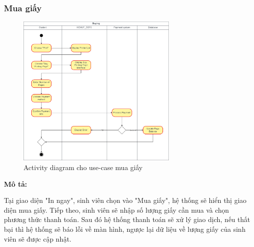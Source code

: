 \subsubsection{Mua giấy}
\begin{figure}[H]
    \begin{center}
        \includegraphics[width=0.7\textwidth]{Images/System Modelling/Buying_Activity.png}
        \caption{Activity diagram cho use-case mua giấy}
    \end{center}
\end{figure}
\textbf{Mô tả: }\par
Tại giao diện "In ngay", sinh viên chọn vào "Mua giấy", hệ thống sẽ hiển thị giao diện mua giấy. Tiếp theo, sinh viên sẽ nhập số lượng giấy cần mua và chọn phương thức thanh toán. Sau đó hệ thống thanh toán sẽ xử lý giao dịch, nếu thất bại thì hệ thống sẽ báo lỗi về màn hình, ngược lại dữ liệu về lượng giấy của sinh viên sẽ được cập nhật.

